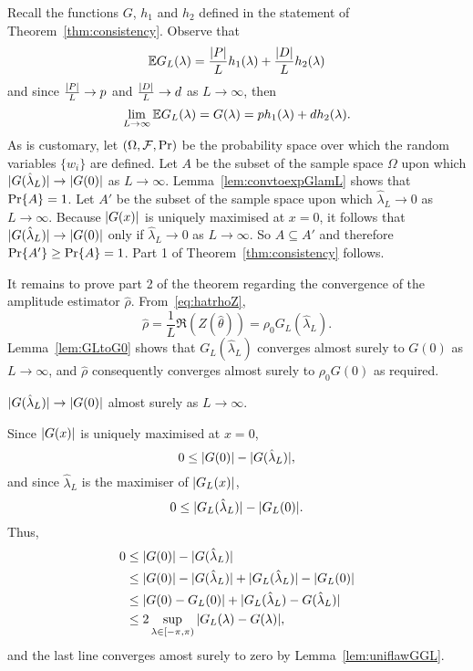 \documentclass[journal]{IEEEtran}
\begin{document}
Recall the functions $G$, $h_1$ and $h_2$ defined in the statement of Theorem~\ref{thm:consistency}.  Observe that
\[
{\mathbb E} G_L(\lambda) = \frac{{\left\vert P \right\vert}}{L} h_1(\lambda) + \frac{{\left\vert D \right\vert}}{L} h_2(\lambda)
\]
and since $\frac{{\left\vert P \right\vert}}{L} \rightarrow p$ and $\frac{{\left\vert D \right\vert}}{L} \rightarrow d$ as $L \rightarrow \infty$, then
\[
\lim_{L \rightarrow\infty} {\mathbb E} G_L(\lambda) = G(\lambda) = p h_1(\lambda)   +  d h_2(\lambda).
\]
As is customary, let $(\Omega, \mathcal F, {\operatorname{Pr}})$ be the probability space over which the random variables $\{w_i\}$ are defined.  Let $A$ be the subset of the sample space $\Omega$ upon which ${\vert G(\hat{\lambda}_L) \vert} \rightarrow {\vert G(0) \vert}$ as $L\rightarrow\infty$.  Lemma~\ref{lem:convtoexpGlamL} shows that ${\operatorname{Pr}}\{A\} = 1$.  Let $A'$ be the subset of the sample space upon which $\hat{\lambda}_L \rightarrow 0$ as $L\rightarrow \infty$.  Because ${\vert G(x) \vert}$ is uniquely maximised at $x=0$, it follows that ${\vert G(\hat{\lambda}_L) \vert} \rightarrow {\vert G(0) \vert}$ only if $\hat{\lambda}_L \rightarrow 0$ as $L \rightarrow\infty$. So $A \subseteq A'$ and therefore ${\operatorname{Pr}}\{A'\} \geq {\operatorname{Pr}}\{A\} = 1$.  Part 1 of Theorem~\ref{thm:consistency} follows.  

It remains to prove part 2 of the theorem regarding the convergence of the amplitude estimator $\hat{\rho}$.  From~\eqref{eq:hatrhoZ},
\begin{equation}\label{eq:rhoGLZ}
\hat{\rho} = \frac{1}{L}\Re(Z(\hat{\theta})) = \rho_0 G_L(\hat{\lambda}_L).
\end{equation}  
Lemma~\ref{lem:GLtoG0} shows that $G_L(\hat{\lambda}_L)$ converges almost surely to $G(0)$ as $L\rightarrow\infty$, and $\hat{\rho}$ consequently converges almost surely to $\rho_0 G(0)$ as required.

\begin{lemma}\label{lem:convtoexpGlamL} 
${\vert G(\hat{\lambda}_L) \vert} \rightarrow {\vert G(0) \vert}$ almost surely as $L \rightarrow \infty$.
\end{lemma}
\begin{IEEEproof}
Since ${\vert G(x) \vert}$ is uniquely maximised at $x=0$,
\[
0 \leq {\vert G(0) \vert} - {\vert G(\hat{\lambda}_L) \vert},
\]
and since $\hat{\lambda}_L$ is the maximiser of ${\left\vert G_L(x) \right\vert}$,
\[ 
0 \leq {\vert G_L(\hat{\lambda}_L) \vert} - {\vert G_L(0) \vert}.
\]
Thus,
\begin{align*}
0 &\leq {\vert G(0) \vert} - {\vert G(\hat{\lambda}_L) \vert} \\ 
& \leq {\vert G(0) \vert} - {\vert G(\hat{\lambda}_L) \vert} + {\vert G_L(\hat{\lambda}_L) \vert} - {\vert G_L(0) \vert}\\
& \leq |G(0) - G_L(0)| + |G_L(\hat{\lambda}_L) - G(\hat{\lambda}_L)| \\
&\leq 2\sup_{\lambda \in [-\pi, \pi)} {\vert G_L(\lambda) - G(\lambda) \vert},
\end{align*}
and the last line converges amost surely to zero by Lemma~\ref{lem:uniflawGGL}.
\end{IEEEproof}
\end{document}
